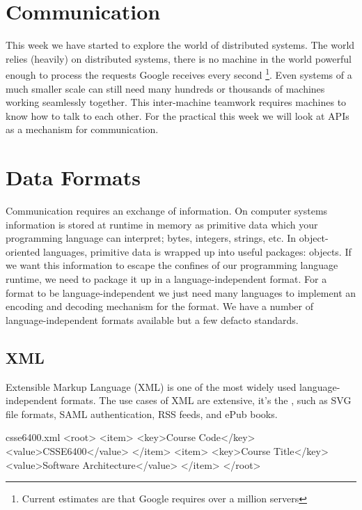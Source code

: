 \documentclass{csse4400}
\begin{document}

\section{Communication}
This week we have started to explore the world of distributed systems.
The world relies (heavily) on distributed systems,
there is no machine in the world powerful enough to process the requests Google receives every second%
\footnote{Current estimates are that Google requires over a million servers}.
Even systems of a much smaller scale can still need many hundreds or thousands of machines working seamlessly together.
This inter-machine teamwork requires machines to know how to talk to each other.
For the practical this week we will look at APIs as a mechanism for communication.

\section{Data Formats}
Communication requires an exchange of information.
On computer systems information is stored at runtime in memory as primitive data which your programming language can interpret;
bytes, integers, strings, etc.
In object-oriented languages,
primitive data is wrapped up into useful packages: objects.
If we want this information to escape the confines of our programming language runtime,
we need to package it up in a language-independent format.
For a format to be language-independent we just need many languages to implement an encoding and decoding mechanism for the format.
We have a number of language-independent formats available but a few defacto standards.

\subsection{XML}
Extensible Markup Language (XML) is one of the most widely used language-independent formats.
The use cases of XML are extensive,
it's the ,
such as SVG file formats, SAML authentication, RSS feeds, and ePub books.

\begin{code}[language=xml]{csse6400.xml}
<root>
  <item>
    <key>Course Code</key>
    <value>CSSE6400</value>
  </item>
  <item>
    <key>Course Title</key>
    <value>Software Architecture</value>
  </item>
</root>
\end{code}
\end{document}
